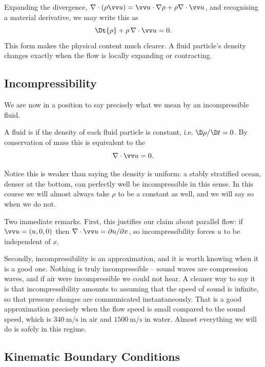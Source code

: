 Expanding the divergence, $\nabla \cdot (\rho \vv u) = \vv u \cdot \nabla \rho + \rho \nabla \cdot \vv u$, and recognising a material derivative, we may write this as
$$
\Dt{\rho} + \rho \, \nabla \cdot \vv u = 0.
$$
This form makes the physical content much clearer. A fluid particle's density changes exactly when the flow is locally expanding or contracting.

\subsection{Incompressibility}

We are now in a position to say precisely what we mean by an incompressible fluid.

\begin{definition}
	A fluid is  if the density of each fluid particle is constant, i.e. $\D\rho/\D t = 0$. By conservation of mass this is equivalent to the 
	$$
	\nabla \cdot \vv u = 0.
	$$
\end{definition}

Notice this is weaker than saying the density is uniform: a stably stratified ocean, denser at the bottom, can perfectly well be incompressible in this sense. In this course we will almost always take $\rho$ to be a constant as well, and we will say so when we do not.

Two immediate remarks. First, this justifies our claim about parallel flow: if $\vv u = (u, 0, 0)$ then $\nabla \cdot \vv u = \partial u/\partial x$, so incompressibility forces $u$ to be independent of $x$.

Secondly, incompressibility is an approximation, and it is worth knowing when it is a good one. Nothing is truly incompressible -- sound waves are compression waves, and if air were incompressible we could not hear. A cleaner way to say it is that incompressibility amounts to assuming that the speed of sound is infinite, so that pressure changes are communicated instantaneously. That is a good approximation precisely when the flow speed is small compared to the sound speed, which is $\SI{340}{\meter\per\second}$ in air and $\SI{1500}{\meter\per\second}$ in water. Almost everything we will do is safely in this regime.

\subsection{Kinematic Boundary Conditions}


